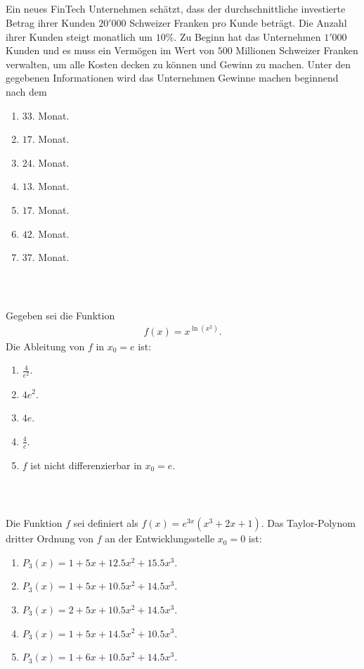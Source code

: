 \subsection*{}
Ein neues FinTech Unternehmen schätzt, dass der durchschnittliche investierte Betrag ihrer Kunden $20'000$ Schweizer Franken pro Kunde beträgt.
Die Anzahl ihrer Kunden steigt monatlich um $10 \% $. Zu Beginn hat das Unternehmen $1'000$ Kunden und es muss ein Vermögen im Wert von $500$ Millionen Schweizer Franken verwalten, um alle Kosten decken zu können und Gewinn zu machen.
Unter den gegebenen Informationen wird das Unternehmen Gewinne machen beginnend nach dem
\renewcommand{\labelenumi}{(\alph{enumi})}
\begin{enumerate}
	\item 
	$33$. Monat.
	\item
	$17$. Monat.
	\item
	$24$. Monat.
	\item
	$13$. Monat.
	\item
	$17$. Monat.
	\item
	$42$. Monat.
	\item
	$37$. Monat.
\end{enumerate}
\ \\
\newpage
\subsection*{}
Gegeben sei die Funktion
\begin{align*}
	f(x) = x^{\ln(x^2)}.
\end{align*}
Die Ableitung von $f$ in $x_0 = e $ ist:
\renewcommand{\labelenumi}{(\alph{enumi})}
\begin{enumerate}
	\item 
	$ \frac{4}{e^2}$.
	\item
	$ 4 e^2 $.
	\item
	$ 4 e $.
	\item
	$ \frac{4}{e} $.
	\item
	$f$ ist nicht differenzierbar in $x_0 = e$.
\end{enumerate}
\ \\
\subsection*{}
Die Funktion $f$ sei definiert als $f(x) = e^{3x} (x^3 +2x +1)$. 
Das Taylor-Polynom dritter Ordnung von $f$ an der Entwicklungsstelle $x_0 = 0$ ist:
\renewcommand{\labelenumi}{(\alph{enumi})}
\begin{enumerate}
\item 
$P_3(x) = 1 + 5x + 12.5 x^2 + 15.5 x^3 $.
\item 
$P_3(x) = 1 + 5x + 10.5 x^2 + 14.5 x^3 $.
\item
$P_3(x) = 2 + 5x + 10.5 x^2 + 14.5 x^3 $.
\item
$P_3(x) = 1 + 5x + 14.5 x^2 + 10.5 x^3 $.
\item
$P_3(x) = 1 + 6x + 10.5 x^2 + 14.5 x^3 $.
\end{enumerate}
\ 
